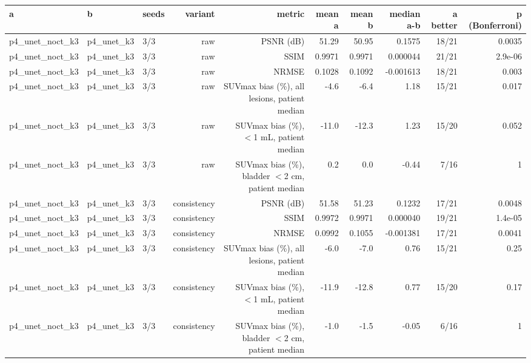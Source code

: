 \begin{tabular}{lllrrrrrrr}
\toprule
a & b & seeds & variant & metric & mean a & mean b & median a-b & a better & p (Bonferroni) \\
\midrule
p4\_unet\_noct\_k3 & p4\_unet\_k3 & 3/3 & raw & PSNR (dB) & 51.29 & 50.95 & 0.1575 & 18/21 & 0.0035 \\
p4\_unet\_noct\_k3 & p4\_unet\_k3 & 3/3 & raw & SSIM & 0.9971 & 0.9971 & 0.000044 & 21/21 & 2.9e-06 \\
p4\_unet\_noct\_k3 & p4\_unet\_k3 & 3/3 & raw & NRMSE & 0.1028 & 0.1092 & -0.001613 & 18/21 & 0.003 \\
p4\_unet\_noct\_k3 & p4\_unet\_k3 & 3/3 & raw & SUVmax bias (\%), all lesions, patient median & -4.6 & -6.4 & 1.18 & 15/21 & 0.017 \\
p4\_unet\_noct\_k3 & p4\_unet\_k3 & 3/3 & raw & SUVmax bias (\%), $<$1 mL, patient median & -11.0 & -12.3 & 1.23 & 15/20 & 0.052 \\
p4\_unet\_noct\_k3 & p4\_unet\_k3 & 3/3 & raw & SUVmax bias (\%), bladder $<$2 cm, patient median & 0.2 & 0.0 & -0.44 & 7/16 & 1 \\
p4\_unet\_noct\_k3 & p4\_unet\_k3 & 3/3 & consistency & PSNR (dB) & 51.58 & 51.23 & 0.1232 & 17/21 & 0.0048 \\
p4\_unet\_noct\_k3 & p4\_unet\_k3 & 3/3 & consistency & SSIM & 0.9972 & 0.9971 & 0.000040 & 19/21 & 1.4e-05 \\
p4\_unet\_noct\_k3 & p4\_unet\_k3 & 3/3 & consistency & NRMSE & 0.0992 & 0.1055 & -0.001381 & 17/21 & 0.0041 \\
p4\_unet\_noct\_k3 & p4\_unet\_k3 & 3/3 & consistency & SUVmax bias (\%), all lesions, patient median & -6.0 & -7.0 & 0.76 & 15/21 & 0.25 \\
p4\_unet\_noct\_k3 & p4\_unet\_k3 & 3/3 & consistency & SUVmax bias (\%), $<$1 mL, patient median & -11.9 & -12.8 & 0.77 & 15/20 & 0.17 \\
p4\_unet\_noct\_k3 & p4\_unet\_k3 & 3/3 & consistency & SUVmax bias (\%), bladder $<$2 cm, patient median & -1.0 & -1.5 & -0.05 & 6/16 & 1 \\
\bottomrule
\end{tabular}
